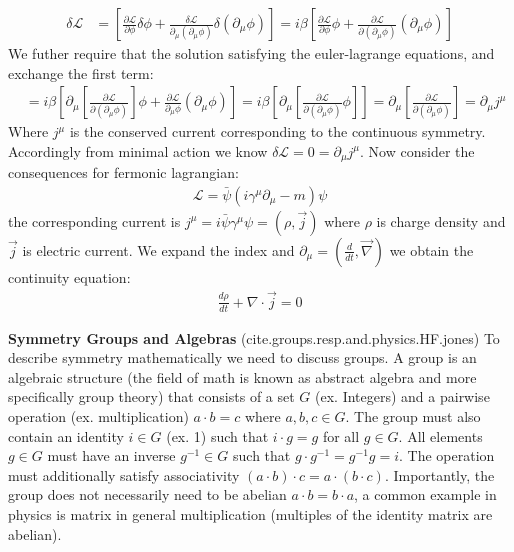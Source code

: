 \begin{align*}
\delta \mathcal{L} &=  \left [ \frac{\partial \mathcal{L}}{\partial \phi} \delta \phi  + \frac{\delta \mathcal{L}}{\partial_\mu (\partial_\mu \phi)} \delta(\partial_\mu \phi) \right] =
 i\beta \left [ \frac{\partial \mathcal{L}}{\partial \phi}  \phi  + \frac{\partial \mathcal{L}}{\partial (\partial_\mu\phi)} (\partial_\mu \phi) \right]
\end{align*}
We futher require that the solution satisfying the euler-lagrange equations, and exchange the first term:
\begin{align*}
&= i\beta \left [ \partial_\mu\left [ \frac{\partial \mathcal{L}}{\partial(\partial_\mu \phi)} \right ]  \phi  + \frac{\partial \mathcal{L}}{\partial_\mu \phi} (\partial_\mu \phi) \right] = i\beta \left [ \partial_\mu  \left [  \frac{\partial \mathcal{L}}{\partial(\partial_\mu \phi)}   \phi  \right ] \right ] = \partial_\mu \left [ \frac{\partial \mathcal{L}}{\partial (\partial_\mu \phi) }\right ] = \partial_\mu j^\mu 
\end{align*}
Where $j^\mu$  is the conserved current corresponding to the continuous symmetry. Accordingly from minimal action we know $\delta \mathcal{L} = 0 = \partial_\mu j^\mu$. 
 Now consider the consequences for fermonic lagrangian:
\begin{align*}
\mathcal{L} = \bar{\psi}(i \gamma^\mu \partial_\mu -m)\psi
\end{align*}
the corresponding current is $j^\mu = i\bar \psi \gamma^\mu \psi = (\rho, \vec j)$ where $\rho$ is charge density and $\vec j$ is electric current.
We expand the index and $\partial_\mu = (\frac{d}{dt}, \vec \nabla)$ we obtain the continuity equation:
\begin{align*}
\frac{d\rho}{dt} + \nabla \cdot \vec j = 0
\end{align*}

\textbf{Symmetry Groups and Algebras}
(cite.groups.resp.and.physics.HF.jones) To describe symmetry mathematically we need to discuss groups. A group
is an algebraic structure (the field of math is known as abstract algebra and more specifically group theory) that 
consists of a set $G$ (ex. Integers) and a pairwise operation (ex. multiplication) $a\cdot b = c$ where $a,b, c\in G$.
The group must also contain an identity $i \in G$ (ex. 1) such that $i\cdot g = g$ for all $g\in G$. All elements 
$g\in G$ must have an inverse $g^{-1} \in G$ such that $g \cdot g^{-1} = g^{-1} g = i$. The operation must additionally
satisfy associativity $(a\cdot b) \cdot c = a \cdot (b \cdot c)$. Importantly, the group does not necessarily 
need to be abelian $a\cdot b = b \cdot a$, a common example in physics is matrix in general multiplication (multiples of the 
identity matrix are abelian).


